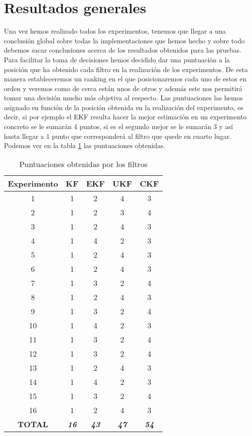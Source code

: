 \section{Resultados generales}

Una vez hemos realizado todos los experimentos, tenemos que llegar a una conclusión global sobre todas la implementaciones que hemos hecho y sobre todo debemos sacar conclusiones acerca de los resultados obtenidos para las pruebas. 
Para facilitar la toma de decisiones hemos decidido dar una puntuación a la posición que ha obtenido cada filtro en la realización de los experimentos.
De esta manera estableceremos un ranking en el que posicionaremos cada uno de estos en orden y veremos como de cerca están unos de otros y además este nos permitirá tomar una decisión mucho más objetiva al respecto.
Las puntuaciones las hemos asignado en función de la posición obtenida en la realización del experimento, es decir, si por ejemplo el \ac{EKF} resulta hacer la mejor estimación en un experimento concreto se le sumarán 4 puntos, si es el segundo mejor se le sumarán 3 y así hasta llegar a 1 punto que corresponderá al filtro que quede en cuarto lugar.
Podemos ver en la tabla \ref{Tabla_puntuaciones} las puntuaciones obtenidas.
\begin{table}[htbp]
\caption{Puntuaciones obtenidas por los filtros}
\begin{center}
\begin{tabular}{|c|c|c|c|c|}
\hline
Experimento & \textbf{KF} & \textbf{EKF} & \textbf{UKF} & \textbf{CKF} \\ \hline
1 & 1 & 2 & 4 & 3 \\ \hline
2 & 1 & 2 & 3 & 4 \\ \hline
3 & 1 & 2 & 4 & 3 \\ \hline
4 & 1 & 4 & 2 & 3 \\ \hline
5 & 1 & 2 & 4 & 3 \\ \hline
6 & 1 & 2 & 4 & 3 \\ \hline
7 & 1 & 3 & 2 & 4 \\ \hline
8 & 1 & 2 & 4 & 3 \\ \hline
9 & 1 & 3 & 2 & 4 \\ \hline
10 & 1 & 4 & 2 & 3 \\ \hline
11 & 1 & 3 & 2 & 4 \\ \hline
12 & 1 & 3 & 2 & 4 \\ \hline
13 & 1 & 2 & 4 & 3 \\ \hline
14 & 1 & 4 & 2 & 3 \\ \hline
15 & 1 & 3 & 2 & 4 \\ \hline
16 & 1 & 2 & 4 & 3 \\ \hline
\textbf{TOTAL} & \textbf{\textit{16}} & \textbf{\textit{43}} & \textbf{\textit{47}} & \textbf{\textit{54}} \\ \hline
\end{tabular}
\end{center}
\label{Tabla_puntuaciones}
\end{table}



